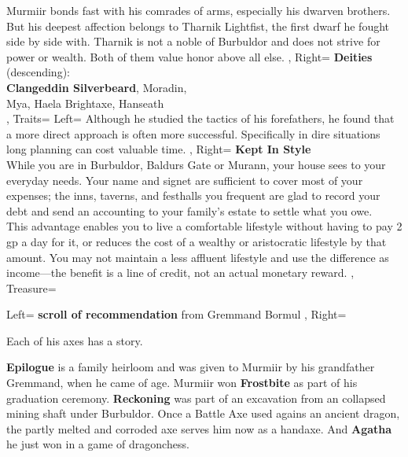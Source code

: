 \documentclass[10pt,a4paper]{scrbook}
\begin{document}
{{{				%
				Murmiir bonds fast with his comrades of arms, especially his dwarven brothers.
				But his deepest affection belongs to Tharnik Lightfist, the first dwarf he fought side by side with.
				Tharnik is not a noble of Burbuldor and does not strive for power or wealth.
				Both of them value honor above all else.
			},
			Right={
				\textbf{Deities} (descending):\\
				\textbf{Clangeddin Silverbeard}, Moradin,\\
				Mya, Haela Brightaxe, Hanseath\\
			}
		},
		Traits={
			Left={
				Although he studied the tactics of his forefathers, he found that a more direct approach is often more successful.
				Specifically in dire situations long planning can cost valuable time.
			},
			Right={
				\textbf{Kept In Style}\\
				While you are in Burbuldor, Baldurs Gate or Murann, your house sees to your everyday needs. Your name and signet are sufficient to cover most of your expenses; the inns, taverns, and festhalls you frequent are glad to record your debt and send an accounting to your family's estate to settle what you owe.\\
				This advantage enables you to live a comfortable lifestyle without having to pay 2 gp a day for it, or reduces the cost of a wealthy or aristocratic lifestyle by that amount. You may not maintain a less affluent lifestyle and use the difference as income—the benefit is a line of credit, not an actual monetary reward.
			}
		},
		Treasure={
			Left={
				\textbf{scroll of recommendation} from Gremmand Bormul
			},
			Right={
				Each of his axes has a story.

				\textbf{Epilogue} is a family heirloom and was given to Murmiir by his grandfather Gremmand, when he came of age.
				Murmiir won \textbf{Frostbite} as part of his graduation ceremony.
				\textbf{Reckoning} was part of an excavation from an collapsed mining shaft under Burbuldor.
				Once a Battle Axe used agains an ancient dragon, the partly melted and corroded axe serves him now as a handaxe.
				And \textbf{Agatha} he just won in a game of dragonchess.
			}
		}
	}

\end{document}
